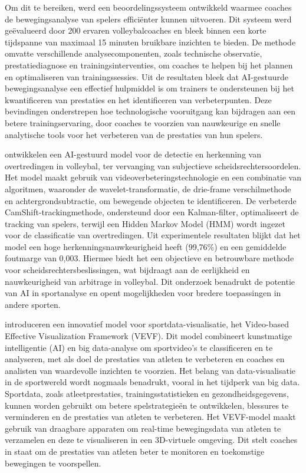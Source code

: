 Om dit te bereiken, werd een beoordelingssysteem ontwikkeld waarmee coaches de bewegingsanalyse van spelers efficiënter kunnen uitvoeren. Dit systeem werd geëvalueerd door 200 ervaren volleybalcoaches en bleek binnen een korte tijdspanne van maximaal 15 minuten bruikbare inzichten te bieden. De methode omvatte verschillende analysecomponenten, zoals technische observatie, prestatiediagnose en trainingsinterventies, om coaches te helpen bij het plannen en optimaliseren van trainingssessies.
Uit de resultaten bleek dat AI-gestuurde bewegingsanalyse een effectief hulpmiddel is om trainers te ondersteunen bij het kwantificeren van prestaties en het identificeren van verbeterpunten.
Deze bevindingen onderstrepen hoe technologische vooruitgang kan bijdragen aan een betere trainingservaring, door coaches te voorzien van nauwkeurige en snelle analytische tools voor het verbeteren van de prestaties van hun spelers.

\textcite{Huang2023} ontwikkelen een AI-gestuurd model voor de detectie en herkenning van overtredingen in volleybal, ter vervanging van subjectieve scheidsrechtersoordelen. Het model maakt gebruik van videoverbeteringstechnologie en een combinatie van algoritmen, waaronder de wavelet-transformatie, de drie-frame verschilmethode en achtergrondsubtractie, om bewegende objecten te identificeren. De verbeterde CamShift-trackingmethode, ondersteund door een Kalman-filter, optimaliseert de tracking van spelers, terwijl een Hidden Markov Model (HMM) wordt ingezet voor de classificatie van overtredingen.
Uit experimentele resultaten blijkt dat het model een hoge herkenningsnauwkeurigheid heeft (99,76\%) en een gemiddelde foutmarge van 0,003. Hiermee biedt het een objectieve en betrouwbare methode voor scheidsrechtersbeslissingen, wat bijdraagt aan de eerlijkheid en nauwkeurigheid van arbitrage in volleybal. Dit onderzoek benadrukt de potentie van AI in sportanalyse en opent mogelijkheden voor bredere toepassingen in andere sporten.

\textcite{Liu2021} introduceren een innovatief model voor sportdata-visualisatie, het Video-based Effective Visualization Framework (VEVF). Dit model combineert kunstmatige intelligentie (AI) en big data-analyse om sportvideo's te classificeren en te analyseren, met als doel de prestaties van atleten te verbeteren en coaches en analisten van waardevolle inzichten te voorzien.
Het belang van data-visualisatie in de sportwereld wordt nogmaals benadrukt, vooral in het tijdperk van big data. Sportdata, zoals atleetprestaties, trainingsstatistieken en gezondheidsgegevens, kunnen worden gebruikt om betere spelstrategieën te ontwikkelen, blessures te verminderen en de prestaties van atleten te verbeteren. Het VEVF-model maakt gebruik van draagbare apparaten om real-time bewegingsdata van atleten te verzamelen en deze te visualiseren in een 3D-virtuele omgeving. Dit stelt coaches in staat om de prestaties van atleten beter te monitoren en toekomstige bewegingen te voorspellen.

